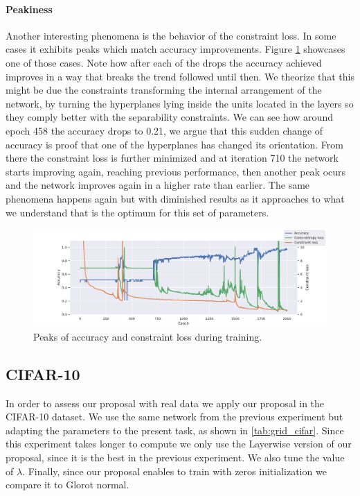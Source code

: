 \paragraph{Peakiness} Another interesting phenomena is the behavior of the constraint loss. In some cases it exhibits peaks which match accuracy improvements. Figure \ref{fig:peaks} showcases one of those cases. Note how after each of the drops the accuracy achieved improves in a way that breaks the trend followed until then. We theorize that this might be due the constraints transforming the internal arrangement of the network, by turning the hyperplanes lying inside the units located in the layers so they comply better with the separability constraints. We can see how around epoch 458 the accuracy drops to 0.21, we argue that this sudden change of accuracy is proof that one of the hyperplanes has changed its orientation. From there the constraint loss is further minimized and at iteration 710 the network starts improving again, reaching previous performance, then another peak ocurs and the network improves again in a higher rate than earlier. The same phenomena happens again but with diminished results as it approaches to what we understand that is the optimum for this set of parameters.

\begin{figure}[h]\label{fig:peaks}
  \caption{Peaks of accuracy and constraint loss during training.}
  \centering
    \includegraphics[width=1.0\textwidth]{peaks}
\end{figure}

\subsection{CIFAR-10}

In order to assess our proposal with real data we apply our proposal in the CIFAR-10 dataset. We use the same network from the previous experiment but adapting the parameters to the present task, as shown in \ref{tab:grid_cifar}. Since this experiment takes longer to compute we only use the Layerwise version of our proposal, since it is the best in the previous experiment. We also tune the value of $\lambda$. Finally, since our proposal enables to train with zeros initialization we compare it to Glorot normal.

